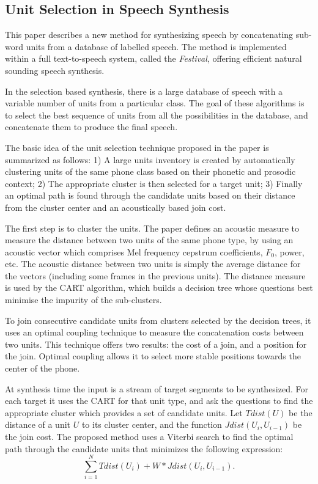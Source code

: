 \subsection{Unit Selection in Speech Synthesis \cite{Black97}}

This paper describes a new method for synthesizing speech by concatenating sub-word units from a database of labelled speech. The method is implemented within a full text-to-speech system, called the \emph{Festival}, offering efficient natural sounding speech synthesis.

In the selection based synthesis, there is a large database of speech with a variable number of units from a particular class. The goal of these algorithms is to select the best sequence of units from all the possibilities in the database, and concatenate them to produce the final speech.

The basic idea of the unit selection technique proposed in the paper is summarized as follows: 1) A large units inventory is created by automatically clustering units of the same phone class based on their phonetic and prosodic context; 2) The appropriate cluster is then selected for a target unit; 3) Finally an optimal path is found through the candidate units based on their distance from the cluster center and an acoustically based join cost.

The first step is to cluster the units. The paper defines an acoustic measure to measure the distance between two units of the same phone type, by using an acoustic vector which comprises Mel frequency cepstrum coefficients, $F_0$, power, etc. The acoustic distance between two units is simply the average distance for the vectors (including some frames in the previous units). The distance measure is used by the CART algorithm, which builds a decision tree whose questions best minimise the impurity of the sub-clusters.

To join consecutive candidate units from clusters selected by the decision trees, it uses an optimal coupling technique to measure the concatenation costs between two units. This technique offers two results: the cost of a join, and a position for the join. Optimal coupling allows it to select more stable positions towards the center of the phone.

At synthesis time the input is a stream of target segments to be synthesized. For each target it uses the CART for that unit type, and ask the questions to find the  appropriate cluster which provides a set of candidate units. Let $Tdist(U)$ be the distance of a unit $U$ to its cluster center, and the function $Jdist(U_i, U_{i-1})$ be the join cost. The proposed method uses a Viterbi search to find the optimal path through the candidate units that minimizes the following expression:
$$\sum_{i=1}^N Tdist(U_i) + W * Jdist(U_i, U_{i-1}).$$

